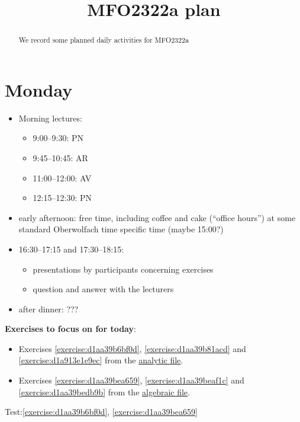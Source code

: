 \documentclass[reqno]{amsart} 
\title{MFO2322a plan}
\begin{document}
\begin{abstract}
  We record some planned daily activities for MFO2322a
\end{abstract}

\section{Monday}
\begin{itemize}
\item Morning lectures:
  \begin{itemize}
  \item 9:00--9:30: PN
  \item 9:45--10:45: AR
  \item 11:00--12:00: AV
  \item 12:15--12:30: PN
  \end{itemize}
\item early afternoon: free time, including coffee and cake (``office hours'') at some standard Oberwolfach time specific time (maybe 15:00?)
\item 16:30--17:15 and 17:30--18:15:
  \begin{itemize}
  \item presentations by participants concerning exercises
  \item question and answer with the lecturers
  \end{itemize}
\item after dinner: ???
\end{itemize}

\textbf{Exercises to focus on for today}:
\begin{itemize}
\item Exercises \ref{exercise:d1aa39b6bf0d}, \ref{exercise:d1aa39b81acd} and \ref{exercise:d1a913e1e9ec} from the \href{20230524T094424__exercises-localized-vectors.pdf}{analytic file}.
\item Exercises \ref{exercise:d1aa39bea659}, \ref{exercise:d1aa39beaf1c} and \ref{exercise:d1aa39bedb9b} from the \href{20230528T213149__microlocal-algebraic-exercises.pdf}{algebraic file}.
\end{itemize}

Test:\ref{exercise:d1aa39b6bf0d}, \ref{exercise:d1aa39bea659}


{} 
\end{document}
